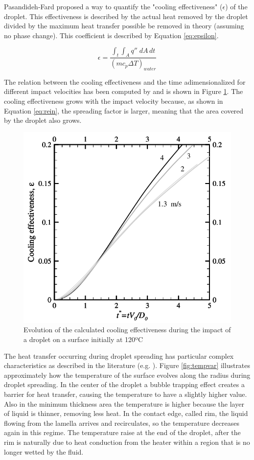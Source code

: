 \par Pasandideh-Fard \cite{pasandideh2001cooling} proposed a way to quantify the "cooling effectiveness" ($\epsilon$) of the droplet. This effectiveness is described by the actual heat removed by the droplet divided by the maximum heat transfer possible be removed in theory (assuming no phase change). This coefficient is described by Equation \ref{eq:epsilon}.

\begin{equation}\label{eq:epsilon}
\epsilon= \frac{\int_t \int_A q'' \; dA \, dt}{(m c_p \Delta T)_{water}}
\end{equation}

\par The relation between the cooling effectiveness and the time adimensionalized for different impact velocities has been computed by \cite{pasandideh2001cooling} and is shown in Figure \ref{fig:cooling}. The cooling effectiveness grows with the impact velocity because, as shown in Equation \ref{eq:rein}, the spreading factor is larger, meaning that the area covered by the droplet also grows.

\begin{figure}[h]
\centering
\includegraphics[width=0.5\linewidth]{Figures/2.Chapter/cooling.png}
\caption {Evolution of the calculated cooling effectiveness during the impact of a droplet on a surface initially at 120ºC}
\label{fig:cooling}
\end{figure}

\par The heat transfer occurring during droplet spreading has particular complex characteristics as described in the literature (e.g. \cite{strotos2011non}). Figure \ref{fig:tempvar} illustrates approximately how the temperature of the surface evolves along the radius during droplet spreading. In the center of the droplet a bubble trapping effect creates a barrier for heat transfer, causing the temperature to have a slightly higher value. Also in the minimum thickness area the temperature is higher because the layer of liquid is thinner, removing less heat. In the contact edge, called rim, the liquid flowing from the lamella arrives and recirculates, so the temperature decreases again in this regime. The temperature raise at the end of the droplet, after the rim is naturally due to heat conduction from the heater within a region that is no longer wetted by the fluid.\\

